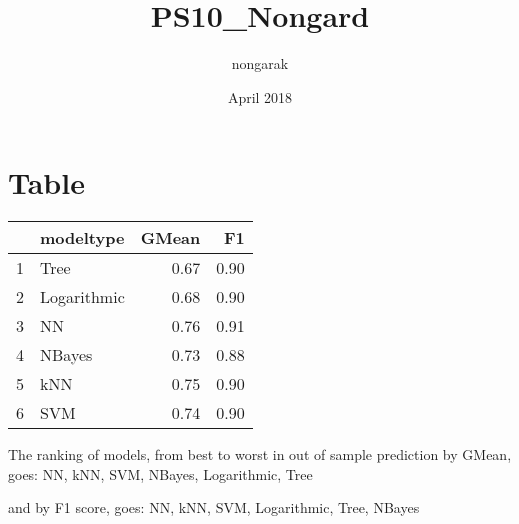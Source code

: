 \documentclass{article}
\title{PS10_Nongard}
\author{nongarak }
\date{April 2018}
\begin{document}
\maketitle

\section{Table}

\begin{table}[ht]
\centering
\begin{tabular}{rlrr}
  \hline
 & modeltype & GMean & F1 \\ 
  \hline
1 & Tree & 0.67 & 0.90 \\ 
  2 & Logarithmic & 0.68 & 0.90 \\ 
  3 & NN & 0.76 & 0.91 \\ 
  4 & NBayes & 0.73 & 0.88 \\ 
  5 & kNN & 0.75 & 0.90 \\ 
  6 & SVM & 0.74 & 0.90 \\ 
   \hline
\end{tabular}
\end{table}

The ranking of models, from best to worst in out of sample prediction by GMean, goes: 
NN,
kNN,
SVM,
NBayes,
Logarithmic,
Tree

and by F1 score, goes:
NN,
kNN,
SVM,
Logarithmic,
Tree,
NBayes
\end{document}
